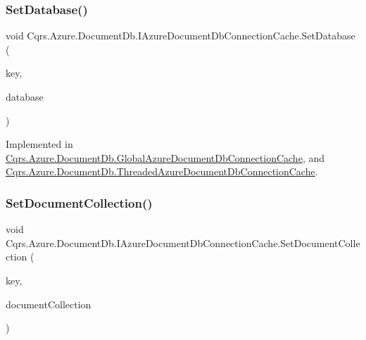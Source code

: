\subsubsection{\texorpdfstring{Set\+Database()}{SetDatabase()}}
{\footnotesize\ttfamily void Cqrs.\+Azure.\+Document\+Db.\+I\+Azure\+Document\+Db\+Connection\+Cache.\+Set\+Database (\begin{DoxyParamCaption}\item[{string}]{key,  }\item[{Database}]{database }\end{DoxyParamCaption})}



Implemented in \hyperlink{classCqrs_1_1Azure_1_1DocumentDb_1_1GlobalAzureDocumentDbConnectionCache_a1684f60eabfa556929fc264e0192906b_a1684f60eabfa556929fc264e0192906b}{Cqrs.\+Azure.\+Document\+Db.\+Global\+Azure\+Document\+Db\+Connection\+Cache}, and \hyperlink{classCqrs_1_1Azure_1_1DocumentDb_1_1ThreadedAzureDocumentDbConnectionCache_ab3c996b8e717aec1e4fc2a70fea52d53_ab3c996b8e717aec1e4fc2a70fea52d53}{Cqrs.\+Azure.\+Document\+Db.\+Threaded\+Azure\+Document\+Db\+Connection\+Cache}.

\mbox{\label{interfaceCqrs_1_1Azure_1_1DocumentDb_1_1IAzureDocumentDbConnectionCache_a6f5dab93f2ebee2503eb808b9031777d_a6f5dab93f2ebee2503eb808b9031777d}} 
\subsubsection{\texorpdfstring{Set\+Document\+Collection()}{SetDocumentCollection()}}
{\footnotesize\ttfamily void Cqrs.\+Azure.\+Document\+Db.\+I\+Azure\+Document\+Db\+Connection\+Cache.\+Set\+Document\+Collection (\begin{DoxyParamCaption}\item[{string}]{key,  }\item[{Document\+Collection}]{document\+Collection }\end{DoxyParamCaption})}



